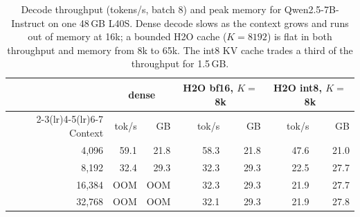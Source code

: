 \begin{table}[t]
  \caption{Decode throughput (tokens/s, batch 8) and peak memory for
  Qwen2.5-7B-Instruct on one 48\,GB L40S. Dense decode slows as the context
  grows and runs out of memory at 16k; a bounded H2O cache ($K{=}8192$) is
  flat in both throughput and memory from 8k to 65k. The int8 KV cache
  trades a third of the throughput for 1.5\,GB.}
  \label{tab:decode_throughput}
  \centering\scriptsize
  \setlength{\tabcolsep}{3pt}
  \begin{tabular}{rrrrrrr}
    \toprule
    & \multicolumn{2}{c}{dense} & \multicolumn{2}{c}{H2O bf16, $K{=}$8k} & \multicolumn{2}{c}{H2O int8, $K{=}$8k} \\
    \cmidrule(lr){2-3}\cmidrule(lr){4-5}\cmidrule(lr){6-7}
    Context & tok/s & GB & tok/s & GB & tok/s & GB \\
    \midrule
    4{,}096  & 59.1 & 21.8 & 58.3 & 21.8 & 47.6 & 21.0 \\
    8{,}192  & 32.4 & 29.3 & 32.3 & 29.3 & 22.5 & 27.7 \\
    16{,}384 & OOM  & OOM  & 32.3 & 29.3 & 21.9 & 27.7 \\
    32{,}768 & OOM  & OOM  & 32.1 & 29.3 & 21.9 & 27.8 \\
    \bottomrule
  \end{tabular}
\end{table}
